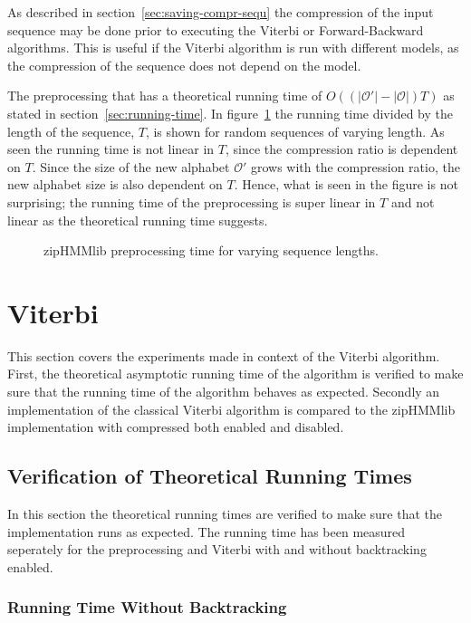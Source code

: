 As described in section~\ref{sec:saving-compr-sequ} the compression of the
input sequence may be done prior to executing the Viterbi or Forward-Backward
algorithms. This is useful if the Viterbi algorithm is run with different
models, as the compression of the sequence does not depend on the model.

The preprocessing that has a theoretical running time of
$O( \left( \lvert\mathcal{O'}\rvert - \lvert{\mathcal{O}}\rvert \right) T)$ as
stated in section~\ref{sec:running-time}. In figure~\ref{fig:pre_viterbi_n} the
running time divided by the length of the sequence, $T$, is shown for random
sequences of varying length. As seen the running time is not linear in $T$,
since the compression ratio is dependent on $T$. Since the size of the new
alphabet $\mathcal{O'}$ grows with the compression ratio, the new alphabet size
is also dependent on $T$. Hence, what is seen in the figure is not surprising;
the running time of the preprocessing is super linear in $T$ and not linear as
the theoretical running time suggests.

\begin{figure}
  \centering
  
  \caption{zipHMMlib preprocessing time for varying sequence lengths.}
  \label{fig:pre_viterbi_n}
\end{figure}

\section{Viterbi}

This section covers the experiments made in context of the Viterbi
algorithm. First, the theoretical asymptotic running time of the algorithm is
verified to make sure that the running time of the algorithm behaves as
expected. Secondly an implementation of the classical Viterbi algorithm is
compared to the zipHMMlib implementation with compressed both enabled and
disabled.

\subsection{Verification of Theoretical Running Times}
\label{sec:theor-runn-times}

In this section the theoretical running times are verified to make sure that
the implementation runs as expected. The running time has been measured
seperately for the preprocessing and Viterbi with and without backtracking
enabled.

\subsubsection{Running Time Without Backtracking}

